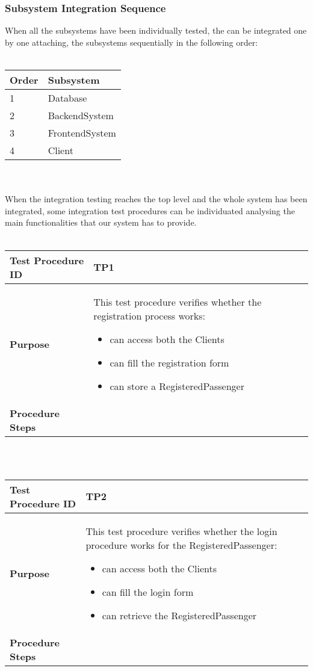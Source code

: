 		\subsubsection{Subsystem Integration Sequence}
			When all the subsystems have been individually tested, the can be integrated one by one
			attaching, the subsystems sequentially in the following order:
			\\ \\
			\begin{tabular}{p{2cm} | p{10cm}} \hline
				\textbf{Order} & \textbf{Subsystem} \\ \hline
				1 & Database \\ \hline
				2 & BackendSystem \\ \hline
				3 & FrontendSystem \\ \hline
				4 & Client \\ \hline
			\end{tabular}
			\\ \\
			When the integration testing reaches the top level and the whole system has been integrated,
			some integration test procedures can be individuated analysing the main functionalities that
			our system has to provide.
			\\ \\
			\begin{tabular}{p{4cm} | p{8cm}} \hline
				\textbf{Test Procedure ID} & TP1 \\ \hline
				\textbf{Purpose} & This test procedure verifies whether the registration process works:
				\begin{itemize}
					\item can access both the Clients
					\item can fill the registration form
					\item can store a RegisteredPassenger
				\end{itemize}
				\\ \hline
				\textbf{Procedure Steps} &  \\ \hline
			\end{tabular}
			\\ \\
			\begin{tabular}{p{4cm} | p{8cm}} \hline
				\textbf{Test Procedure ID} & TP2 \\ \hline
				\textbf{Purpose} & This test procedure verifies whether the login procedure works
					for the RegisteredPassenger:
					\begin{itemize}
						\item can access both the Clients
						\item can fill the login form
						\item can retrieve the RegisteredPassenger
					\end{itemize}
				\\ \hline
				\textbf{Procedure Steps} &  \\ \hline
			\end{tabular}
